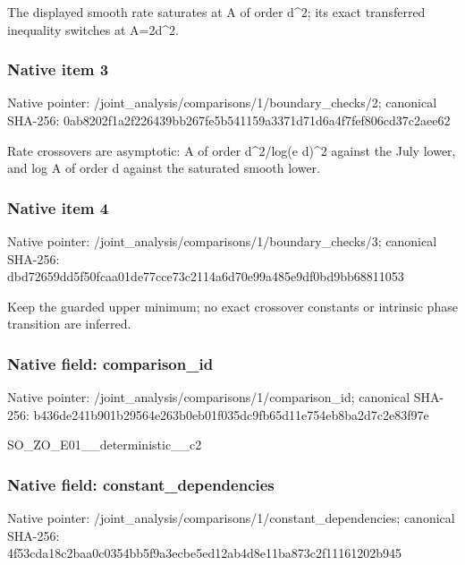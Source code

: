 \documentclass[10pt,a4paper]{article}
\begin{document}
\begingroup\raggedright\sloppy The displayed smooth rate saturates at A of order d\textasciicircum{}2;\allowbreak{} its exact transferred inequality switches at A=\allowbreak{}2d\textasciicircum{}2.\par\endgroup

\subsubsection{Native item 3}
Native pointer: /joint\_\allowbreak{}analysis/comparisons/1/boundary\_\allowbreak{}checks/2; canonical SHA-256: 0ab8202f1a2f226439bb267fe5b541159a3371d71d6a4f7fef806cd37c2aee62

\begingroup\raggedright\sloppy Rate crossovers are asymptotic:\allowbreak{} A of order d\textasciicircum{}2/\allowbreak{}log(e d)\textasciicircum{}2 against the July lower,\allowbreak{} and log A of order d against the saturated smooth lower.\par\endgroup

\subsubsection{Native item 4}
Native pointer: /joint\_\allowbreak{}analysis/comparisons/1/boundary\_\allowbreak{}checks/3; canonical SHA-256: dbd72659dd5f50fcaa01de77cce73c2114a6d70e99a485e9df0bd9bb68811053

\begingroup\raggedright\sloppy Keep the guarded upper minimum;\allowbreak{} no exact crossover constants or intrinsic phase transition are inferred.\par\endgroup

\subsubsection{Native field: comparison\_\allowbreak{}id}
Native pointer: /joint\_\allowbreak{}analysis/comparisons/1/comparison\_\allowbreak{}id; canonical SHA-256: b436de241b901b29564e263b0eb01f035dc9fb65d11e754eb8ba2d7c2e83f97e

\begingroup\raggedright\sloppy SO\_\allowbreak{}ZO\_\allowbreak{}E01\_\allowbreak{}\_\allowbreak{}deterministic\_\allowbreak{}\_\allowbreak{}c2\par\endgroup

\subsubsection{Native field: constant\_\allowbreak{}dependencies}
Native pointer: /joint\_\allowbreak{}analysis/comparisons/1/constant\_\allowbreak{}dependencies; canonical SHA-256: 4f53cda18c2baa0c0354bb5f9a3ecbe5ed12ab4d8e11ba873c2f11161202b945
\end{document}
